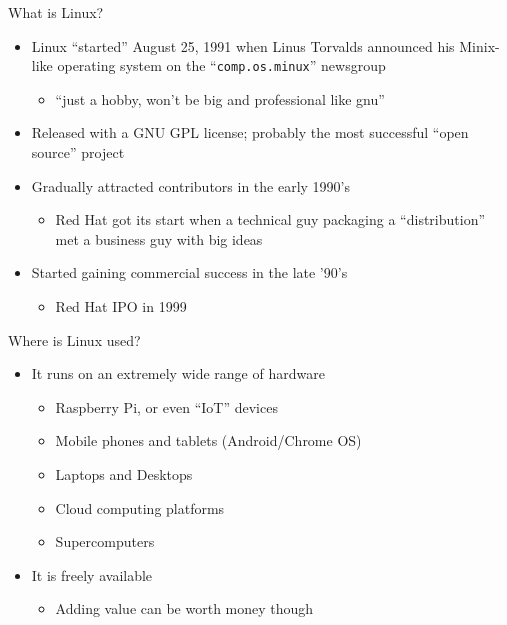 \documentclass[aspectratio=169, notes]{beamer}
\begin{document}
\begin{frame}{What is Linux?}
	\pause
	\begin{itemize}
	\item Linux ``started'' August 25, 1991 when Linus Torvalds announced his Minix-like operating system on the ``\texttt{comp.os.minux}'' newsgroup
		\begin{itemize}
		\item ``just a hobby, won't be big and professional like gnu''
		\end{itemize}
	\item Released with a GNU GPL license; probably the most successful ``open source'' project
	\item Gradually attracted contributors in the early 1990's
		\begin{itemize}
		\item Red Hat got its start when a technical guy packaging a ``distribution'' met a business guy with big ideas
		\end{itemize}
	\item Started gaining commercial success in the late '90's
		\begin{itemize}
		\item Red Hat IPO in 1999
		\end{itemize}
	\end{itemize}
\end{frame}

\begin{frame}{Where is Linux used?}
	\begin{itemize}
	\item It runs on an extremely wide range of hardware
		\begin{itemize}
		\item Raspberry Pi, or even ``IoT'' devices
		\item Mobile phones and tablets (Android/Chrome OS)
		\item Laptops and Desktops
		\item Cloud computing platforms
		\item Supercomputers
		\end{itemize}
	\item It is freely available
		\begin{itemize}
		\item Adding value can be worth money though
		\end{itemize}
	\end{itemize}
\end{frame}
\end{document}
